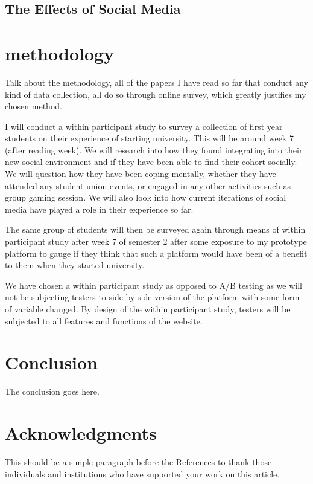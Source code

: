 \documentclass[lettersize,journal]{IEEEtran}
\begin{document}
\subsection{The Effects of Social Media}

\section{methodology}
Talk about the methodology, all of the papers I have read so far that conduct
any kind of data collection, all do so through online survey, which greatly
justifies my chosen method.

I will conduct a within participant study to survey a collection of first year
students on their experience of starting university. This will be around week
7 (after reading week). We will research into how they found
integrating into their new social environment and if they have been able to
find their cohort socially. We will question how they have been
coping mentally, whether they have attended any student union
events, or engaged in any other activities such as group
gaming session. We will also look into how current
iterations of social media have played a role in their
experience so far.

The same group of students will then be surveyed again
through means of within participant study after week 7 of
semester 2 after some exposure to my prototype platform to gauge if they think
that such a platform would have been of a benefit to them when they
started university.

We have chosen a within participant study as opposed to A/B
testing as we will not be subjecting testers to side-by-side
version of the platform with some form of variable
changed. By design of the within participant study,
testers will be subjected to all features and functions of the
website.

\section{Conclusion}
The conclusion goes here.


\section*{Acknowledgments}
This should be a simple paragraph before the References to thank those individuals and institutions who have supported your work on this article.
\end{document}
